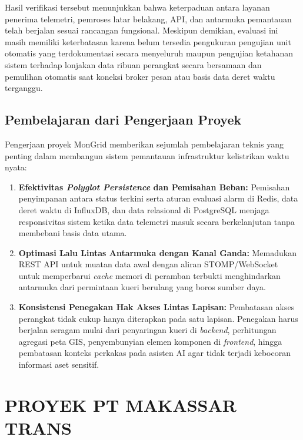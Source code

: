 Hasil verifikasi tersebut menunjukkan bahwa keterpaduan antara layanan penerima telemetri, pemroses latar belakang, API, dan antarmuka pemantauan telah berjalan sesuai rancangan fungsional. Meskipun demikian, evaluasi ini masih memiliki keterbatasan karena belum tersedia pengukuran pengujian unit otomatis yang terdokumentasi secara menyeluruh maupun pengujian ketahanan sistem terhadap lonjakan data ribuan perangkat secara bersamaan dan pemulihan otomatis saat koneksi broker pesan atau basis data deret waktu terganggu.

\subsection{Pembelajaran dari Pengerjaan Proyek}

Pengerjaan proyek MonGrid memberikan sejumlah pembelajaran teknis yang penting dalam membangun sistem pemantauan infrastruktur kelistrikan waktu nyata:

\begin{enumerate}[label=\arabic*., leftmargin=*, itemsep=0pt]
  \item \textbf{Efektivitas \textit{Polyglot Persistence} dan Pemisahan Beban:} Pemisahan penyimpanan antara status terkini serta aturan evaluasi alarm di Redis, data deret waktu di InfluxDB, dan data relasional di PostgreSQL menjaga responsivitas sistem ketika data telemetri masuk secara berkelanjutan tanpa membebani basis data utama.
  \item \textbf{Optimasi Lalu Lintas Antarmuka dengan Kanal Ganda:} Memadukan REST API untuk muatan data awal dengan aliran STOMP/WebSocket untuk memperbarui \textit{cache} memori di peramban terbukti menghindarkan antarmuka dari permintaan kueri berulang yang boros sumber daya.
  \item \textbf{Konsistensi Penegakan Hak Akses Lintas Lapisan:} Pembatasan akses perangkat tidak cukup hanya diterapkan pada satu lapisan. Penegakan harus berjalan seragam mulai dari penyaringan kueri di \textit{backend}, perhitungan agregasi peta GIS, penyembunyian elemen komponen di \textit{frontend}, hingga pembatasan konteks perkakas pada asisten AI agar tidak terjadi kebocoran informasi aset sensitif.
\end{enumerate}

\section{PROYEK PT MAKASSAR TRANS}

